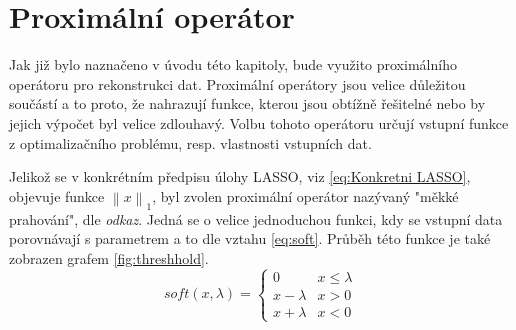 \documentclass[FM,BP]{tulthesis}
\newcounter{Vzorce}
\begin{document}
\section{Proximální operátor}
Jak již bylo naznačeno v úvodu této kapitoly, bude využito proximálního operátoru pro rekonstrukci dat. Proximální operátory jsou velice důležitou součástí a to proto, že nahrazují funkce, kterou jsou obtížně řešitelné nebo by jejich výpočet byl velice zdlouhavý. Volbu tohoto operátoru určují vstupní funkce z optimalizačního problému, resp. vlastnosti vstupních dat. 

Jelikož se v konkrétním předpisu úlohy LASSO, viz \ref{eq:Konkretni LASSO}, objevuje funkce $\left\| x\right\| _1$, byl zvolen proximální operátor nazývaný "měkké prahování", dle \textit{odkaz}. Jedná se o velice jednoduchou funkci, kdy se vstupní data porovnávají s parametrem a to dle vztahu \ref{eq:soft}. Průběh této funkce je také zobrazen grafem \ref{fig:threshhold}.
\begin{equation} \label{eq:soft} \tag{Vzorec \theVzorce}
soft(x, \lambda) = \begin{cases}
0  & x \leq \lambda\\
x - \lambda & x > 0\\
x + \lambda & x < 0
\end{cases}
\end{equation}
 
\end{document}
